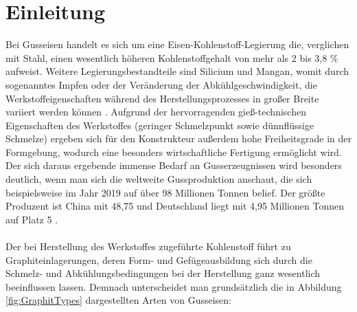 \documentclass[
fontsize=10pt, 
listof = totoc,
parskip = half	
]{report}
\begin{document}
\chapter{Einleitung}
\label{ch:Einleitung}

Bei Gusseisen handelt es sich um eine Eisen-Kohlenstoff-Legierung die, verglichen mit Stahl, einen wesentlich höheren Kohlenstoffgehalt von mehr als 2 bis 3,8 \% aufweist. Weitere Legierungsbestandteile sind Silicium und Mangan, womit durch sogenanntes Impfen oder der Veränderung der Abkühlgeschwindigkeit, die Werkstoffeigenschaften während des Herstellungsprozesses in großer Breite variiert werden können \cite{BDGuss02}. Aufgrund der hervorragenden gieß-technischen Eigenschaften des Werkstoffes (geringer Schmelzpunkt sowie dünnflüssige Schmelze) ergeben sich für den Konstrukteur außerdem hohe Freiheitsgrade in der Formgebung, wodurch eine besonders wirtschaftliche Fertigung ermöglicht wird. Der sich daraus ergebende immense Bedarf an Gusserzeugnissen wird besonders deutlich, wenn man sich die weltweite Gussproduktion anschaut, die sich beispielsweise im Jahr 2019 auf über 98 Millionen Tonnen belief. Der größte Produzent ist China mit 48,75 und Deutschland liegt mit 4,95 Millionen Tonnen auf Platz 5 \cite{Statista2021}.
\\\\
Der bei Herstellung des Werkstoffes zugeführte Kohlenstoff führt zu Graphiteinlagerungen, deren Form- und Gefügeausbildung sich durch die Schmelz- und Abkühlungsbedingungen bei der Herstellung ganz wesentlich beeinflussen lassen. Demnach unterscheidet man grundsätzlich die in Abbildung \ref{fig:GraphitTypes} dargestellten Arten von Gusseisen:
\end{document}

